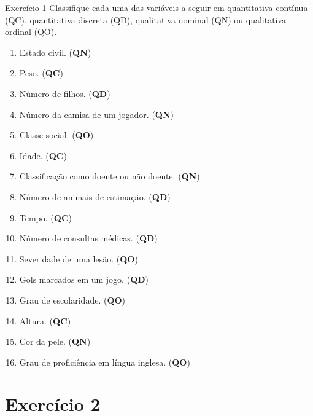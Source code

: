 \documentclass[
  ignorenonframetext,
  serif,
  professionalfont,
  usenames,
  dvipsnames,
  aspectratio = 169]{beamer}
\providecommand{\tightlist}{%
  \setlength{\itemsep}{0pt}\setlength{\parskip}{0pt}}
\renewcommand{\tightlist}{%
  \setlength{\itemsep}{0\baselineskip}
  \setlength{\parskip}{0.25\baselineskip}
}
\def\beginAHalfColumn{\begin{minipage}{0.49\textwidth}}%
\def\endColumns{\end{minipage}}%
\begin{document}
\begin{frame}{Exercício 1}
\label{exercuxedcio-1-2}
Classifique cada uma das variáveis a seguir em quantitativa contínua
(QC), quantitativa discreta (QD), qualitativa nominal (QN) ou
qualitativa ordinal (QO).

\vspace{0.3cm}

\beginAHalfColumn

\begin{enumerate}
\tightlist
\item
  Estado civil. (\textbf{QN})
\item
  Peso. (\textbf{QC})
\item
  Número de filhos. (\textbf{QD})
\item
  Número da camisa de um jogador. (\textbf{QN})
\item
  Classe social. (\textbf{QO})
\item
  Idade. (\textbf{QC})
\item
  Classificação como doente ou não doente. (\textbf{QN})
\item
  Número de animais de estimação. (\textbf{QD})
\end{enumerate}

\endColumns
\beginAHalfColumn

\begin{enumerate}
\setcounter{enumi}{8}
\tightlist
\item
  Tempo. (\textbf{QC})
\item
  Número de consultas médicas. (\textbf{QD})
\item
  Severidade de uma lesão. (\textbf{QO})
\item
  Gols marcados em um jogo. (\textbf{QD})
\item
  Grau de escolaridade. (\textbf{QO})
\item
  Altura. (\textbf{QC})
\item
  Cor da pele. (\textbf{QN})
\item
  Grau de proficiência em língua inglesa. (\textbf{QO})
\end{enumerate}

\endColumns
\end{frame}

\section{Exercício 2}\label{exercuxedcio-2}
\end{document}
